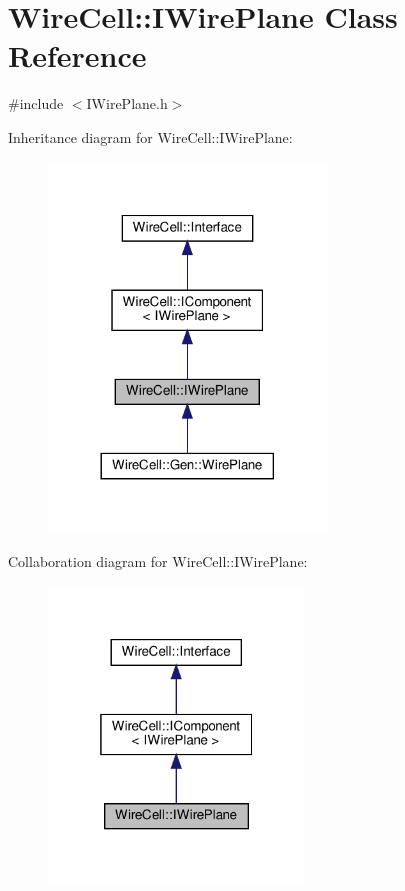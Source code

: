 \hypertarget{class_wire_cell_1_1_i_wire_plane}{}\section{Wire\+Cell\+:\+:I\+Wire\+Plane Class Reference}
\label{class_wire_cell_1_1_i_wire_plane}


{\ttfamily \#include $<$I\+Wire\+Plane.\+h$>$}



Inheritance diagram for Wire\+Cell\+:\+:I\+Wire\+Plane\+:
\nopagebreak
\begin{figure}[H]
\begin{center}
\leavevmode
\includegraphics[width=209pt]{class_wire_cell_1_1_i_wire_plane__inherit__graph}
\end{center}
\end{figure}


Collaboration diagram for Wire\+Cell\+:\+:I\+Wire\+Plane\+:
\nopagebreak
\begin{figure}[H]
\begin{center}
\leavevmode
\includegraphics[width=193pt]{class_wire_cell_1_1_i_wire_plane__coll__graph}
\end{center}
\end{figure}
